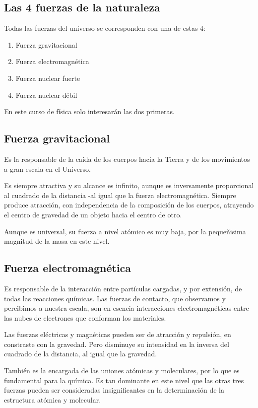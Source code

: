 \subsection{Las 4 fuerzas de la naturaleza}

Todas las fuerzas del universo se corresponden con una de estas 4:
\begin{enumerate}
    \item Fuerza gravitacional
    \item Fuerza electromagnética
    \item Fuerza nuclear fuerte
    \item Fuerza nuclear débil
\end{enumerate}

En este curso de física solo interesarán las dos primeras.

\subsection{Fuerza gravitacional}

Es la responsable de la caída de los cuerpos hacia la Tierra y de los movimientos 
a gran escala en el Universo.

Es siempre atractiva y su alcance es infinito,
aunque es inversamente proporcional al cuadrado de la distancia 
-al igual que la fuerza electromagnética.
Siempre produce atracción, con independencia de la composición de los cuerpos,
atrayendo el centro de gravedad de un objeto hacia el centro de otro.

Aunque es universal,
su fuerza a nivel atómico es muy baja,
por la pequeñisima magnitud de la masa en este nivel.

\subsection{Fuerza electromagnética}

Es responsable de la interacción entre partículas cargadas,
y por extensión, de todas las reacciones químicas.
Las fuerzas de contacto, que observamos y percibimos a nuestra escala,
son en esencia interacciones electromagnéticas entre las nubes de electrones
que conforman los materiales.

Las fuerzas eléctricas y magnéticas pueden ser de atracción y repulsión,
en constraste con la gravedad.
Pero disminuye su intensidad en la inversa del cuadrado de la distancia,
al igual que la gravedad.

También es la encargada de las uniones atómicas y moleculares,
por lo que es fundamental para la química.
Es tan dominante en este nivel que las otras tres fuerzas pueden ser 
consideradas insignificantes en la determinación de la estructura atómica y 
molecular.

